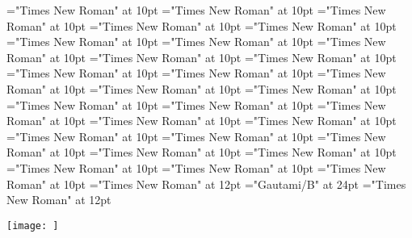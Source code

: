 \documentclass{article}
\begin{document}
 
\thispagestyle{empty} 
\font\spanxitemtranslationtranslationsexamplessensesensesentryletDatadicBody="Times New Roman" at 10pt
\font\xitemtranslationtranslationsexamplessensesensesentryletDatadicBody="Times New Roman" at 10pt
\font\translationtranslationsexamplessensesensesentryletDatadicBody="Times New Roman" at 10pt
\font\translationsexamplessensesensesentryletDatadicBody="Times New Roman" at 10pt
\font\spanexampleexamplessensesensesentryletDatadicBody="Times New Roman" at 10pt
\font\exampleexamplessensesensesentryletDatadicBody="Times New Roman" at 10pt
\font\examplessensesensesentryletDatadicBody="Times New Roman" at 10pt
\font\spanLexSensepublishStemGlossPubsensesensesentryletDatadicBody="Times New Roman" at 10pt
\font\LexSensepublishStemGlossPubsensesensesentryletDatadicBody="Times New Roman" at 10pt
\font\spandefinitionsensesensesentryletDatadicBody="Times New Roman" at 10pt
\font{}="Times New Roman" at 10pt
\font\xsensenumbersensesentryletDatadicBody="Times New Roman" at 10pt
\font\spanpartofspeechgrammaticalinfosensesensesentryletDatadicBody="Times New Roman" at 10pt
\font\partofspeechgrammaticalinfosensesensesentryletDatadicBody="Times New Roman" at 10pt
\font\grammaticalinfosensesensesentryletDatadicBody="Times New Roman" at 10pt
\font\sensesensesentryletDatadicBody="Times New Roman" at 10pt
\font\sensesentryletDatadicBody="Times New Roman" at 10pt
\font\spanpronunciationpronunciationsentryletDatadicBody="Times New Roman" at 10pt
\font\pronunciationpronunciationsentryletDatadicBody="Times New Roman" at 10pt
\font\pronunciationsentryletDatadicBody="Times New Roman" at 10pt
\font\headwordentryletDatadicBody="Times New Roman" at 10pt
\font\spanpictureLabelpictureCaptionpictureRightentryletDatadicBody="Times New Roman" at 10pt
\font\pictureLabelpictureCaptionpictureRightentryletDatadicBody="Times New Roman" at 10pt
\font\CmPicturepublishStemPileThumbnailPubpictureCaptionpictureRightentryletDatadicBody="Times New Roman" at 10pt
\font\pictureCaptionpictureRightentryletDatadicBody="Times New Roman" at 10pt
\font\picturepictureRightentryletDatadicBody="Times New Roman" at 10pt
\font\pictureRightentryletDatadicBody="Times New Roman" at 10pt
\font\entryletDatadicBody="Times New Roman" at 10pt
\font{}="Times New Roman" at 12pt
\font{}="Gautami/B" at 24pt
\font{}="Times New Roman" at 12pt



\begin{wrapfigure}
\begin{center}
{\texttt{[image: ]}} 
\caption{}
\end{center}
\end{wrapfigure}
\end{document}
